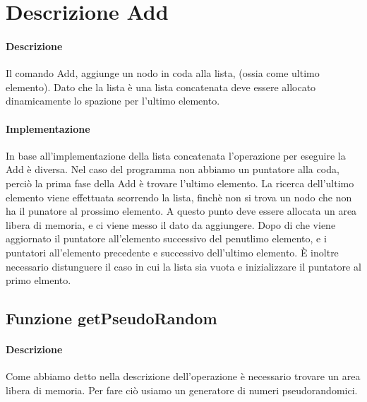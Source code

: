 \section{Descrizione Add}
\paragraph{Descrizione}
Il comando Add, aggiunge un nodo in coda alla lista, (ossia come ultimo elemento). 
Dato che la lista è una lista concatenata deve essere allocato dinamicamente lo spazione per l'ultimo elemento.

\paragraph{Implementazione}
In base all'implementazione della lista concatenata l'operazione per eseguire la Add è diversa.
Nel caso del programma non abbiamo un puntatore alla coda, perciò la prima fase della Add è trovare l'ultimo elemento.
La ricerca dell'ultimo elemento viene effettuata scorrendo la lista, finchè non si trova un nodo che non ha il punatore al prossimo elemento.
A questo punto deve essere allocata un area libera di memoria, e ci viene messo il dato da aggiungere.
Dopo di che viene aggiornato il puntatore all'elemento successivo del penutlimo elemento, 
e i puntatori all'elemento precedente e successivo dell'ultimo elemento.
È inoltre necessario distunguere il caso in cui la lista sia vuota e inizializzare il puntatore al primo elmento.

\subsection{Funzione getPseudoRandom}
\paragraph{Descrizione}
Come abbiamo detto nella descrizione dell'operazione è necessario trovare un area libera di memoria.
Per fare ciò usiamo un generatore di numeri pseudorandomici. 
